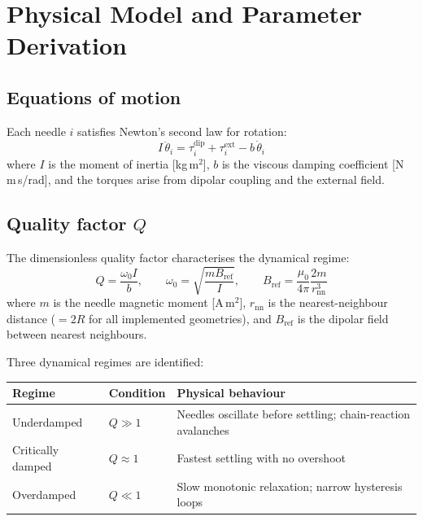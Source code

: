 \documentclass[11pt,a4paper]{article}
\begin{document}
\section{Physical Model and Parameter Derivation}
\label{sec:physics}

\subsection{Equations of motion}

Each needle $i$ satisfies Newton's second law for rotation:
\begin{equation}
  I\,\ddot{\theta}_i = \tau_i^{\mathrm{dip}} + \tau_i^{\mathrm{ext}} - b\,\dot{\theta}_i
\end{equation}
where $I$ is the moment of inertia [kg\,m$^2$], $b$ is the viscous damping
coefficient [N\,m\,s/rad], and the torques arise from dipolar coupling and
the external field.

\subsection{Quality factor $Q$}

The dimensionless quality factor characterises the dynamical regime:
\begin{equation}
  Q = \frac{\omega_0 I}{b}, \qquad
  \omega_0 = \sqrt{\frac{m B_{\mathrm{ref}}}{I}}, \qquad
  B_{\mathrm{ref}} = \frac{\mu_0}{4\pi}\frac{2m}{r_{\mathrm{nn}}^3}
\end{equation}
where $m$ is the needle magnetic moment [A\,m$^2$], $r_{\mathrm{nn}}$ is the
nearest-neighbour distance ($= 2R$ for all implemented geometries), and
$B_{\mathrm{ref}}$ is the dipolar field between nearest neighbours.

\medskip
\noindent Three dynamical regimes are identified:

\begin{center}
\begin{tabular}{lll}
\toprule
Regime & Condition & Physical behaviour \\
\midrule
Underdamped & $Q \gg 1$ & Needles oscillate before settling; chain-reaction avalanches \\
Critically damped & $Q \approx 1$ & Fastest settling with no overshoot \\
Overdamped & $Q \ll 1$ & Slow monotonic relaxation; narrow hysteresis loops \\
\bottomrule
\end{tabular}
\end{center}
\end{document}
